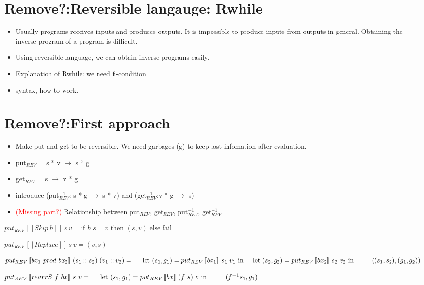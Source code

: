 \documentclass[runningheads]{llncs}
\newcommand{\tab}{\hspace*{5mm}}
\newcommand{\qtab}{\hspace*{5mm} \ \quad}
\newcommand{\sif}[3]{\text{if } #1 \text{ then } #2 \text{ else } #3}
\newcommand{\product}[2]{#1 \ prod \ #2}
\newcommand{\tuple}[2]{(#1 :: #2)}
\newcommand{\rearrS}[2]{rearrS \ #1 \ #2}
\newcommand{\putrev}[3]{put_{REV} \, [\![#1]\!] \ {#2} \ {#3}}
\begin{document}
\section{Remove?:Reversible langauge: Rwhile}


\begin{itemize}
\item Usually programs receives inputs and produces outputs. It is impossible to produce inputs from outputs in general. Obtaining the inverse program of a program is difficult.
\item Using reversible language, we can obtain inverse programs easily.
\item Explanation of Rwhile: we need fi-condition.
\item syntax, how to work.
\end{itemize}

\section{Remove?:First approach}


\begin{itemize}
\item Make put and get to be reversible. We need garbages (g) to keep lost infomation after evaluation.
\item put$_{REV}$ = s * v $\to$ s * g
\item get$_{REV}$ = s $\to$ v * g
\item introduce (put$_{REV}^{-1}$: s * g $\to$ s * v) and (get$_{REV}^{-1}$:v * g $\to$ s)
\item \textcolor{red}{(Missing part?)} Relationship between put$_{REV}$, get$_{REV}$, put$_{REV}^{-1}$, get$_{REV}^{-1}$ 
\end{itemize}

$\putrev{Skip \ h}{s}{v} =  \sif{h \ s = v}{(s, v)}{\text{fail}}$

$\putrev{Replace}{s}{v} = (v, s)$

$\putrev{\product{bx_1}{bx_2}}{\tuple{s_1}{s_2}}{\tuple{v_1}{v_2}} =\\
    \tab \text{let} \ (s_1, g_1) = \putrev{bx_1}{s_1}{v_1} \ \text{in}\\
    \tab \text{let} \ (s_2, g_2) = \putrev{bx_2}{s_2}{v_2} \ \text{in}\\
        \qtab ((s_1, s_2), (g_1, g_2))$

$\putrev{\rearrS{f}{bx}}{s}{v} =\\
    \tab \text{let} \ (s_1, g_1) = \putrev{bx}{(f \ s)}{v} \ \text{in}\\
        \qtab (f^{-1} s_1, g_1)$
\end{document}
